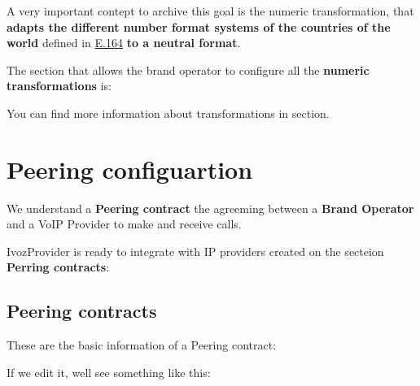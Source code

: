 \documentclass[letterpaper,10pt,english]{sphinxmanual}
\begin{document}
A very important contept to archive this goal is the numeric transformation,
that \textbf{adapts the different number format systems of the countries of the world}
defined in \href{https://www.itu.int/rec/T-REC-E.164/es}{E.164} \textbf{to a neutral
format}.

The section that allows the brand operator to configure all the \textbf{numeric
transformations} is:


You can find more information about transformations in {\hyperref[brand/transformations/index:numeric\string-transformations]{}} section.


\section{Peering configuartion}
\label{getting_started/external_incoming_calls/peering::doc}\label{getting_started/external_incoming_calls/peering:peering-configuartion}
We understand a \textbf{Peering contract} the agreeming between a \textbf{Brand Operator}
and a VoIP Provider to make and receive calls.

IvozProvider is ready to integrate with IP providers created on the secteion
\textbf{Perring contracts}:



\subsection{Peering contracts}
\label{brand/peering/peering_contracts:id1}\label{brand/peering/peering_contracts::doc}\label{brand/peering/peering_contracts:peering-contracts}
These are the basic information of a Peering contract:


If we edit it, well see something like this:
\end{document}
